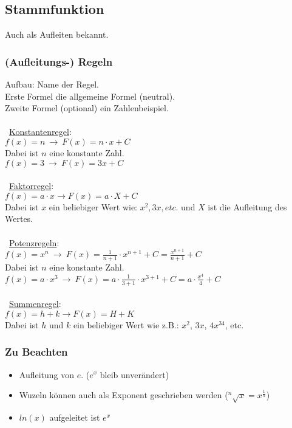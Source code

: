 \subsection{Stammfunktion}
Auch als Aufleiten bekannt.
\subsubsection{(Aufleitungs-) Regeln}
\label{sec:aufleitungs_regeln}
Aufbau: Name der Regel. \\
Erste Formel die allgemeine Formel (neutral). \\
Zweite Formel (optional) ein Zahlenbeispiel. \\\\
\
\underline{Konstantenregel}: \\
$f(x) = n\ \rightarrow\ F(x) = n\cdot x + C$ \\
Dabei ist $n$ eine konstante Zahl. \\
$f(x) = 3\ \rightarrow\ F(x) = 3x + C$ \\\\
\
\underline{Faktorregel}: \\
$f(x) = a\cdot x \rightarrow F(x) = a\cdot X + C$ \\
Dabei ist $x$ ein beliebiger Wert wie: $x^2, 3x, etc.$ und $X$ ist die Aufleitung des Wertes. \\\\
\
\underline{Potenzregeln}: \\
$f(x) = x^n\ \rightarrow\ F(x) = \frac{1}{n + 1}\cdot x^{n + 1} + C = \frac{x^{n+1}}{n+1} + C$\\
Dabei ist $n$ eine konstante Zahl. \\
$f(x) = a\cdot x^3\ \rightarrow\ F(x) = a\cdot \frac{1}{3 + 1}\cdot x^{3 + 1} + C= a\cdot \frac{x^{4}}{4} + C$ \\\\
\
\underline{Summenregel}: \\
$f(x) = h + k \rightarrow F(x) = H + K$ \\
Dabei ist $h$ und $k$ ein beliebiger Wert wie z.B.: $x^2$, $3x$, $4x^34$, etc. \\

\subsubsection{Zu Beachten}
\begin{itemize}
    \item Aufleitung von $e$. ($e^x$ bleib unverändert)
    \item Wuzeln können auch als Exponent geschrieben werden ($^n\sqrt{x} = x^{\frac{1}{n}}$)
    \item $ln(x)$ aufgeleitet ist $e^x$
\end{itemize}

